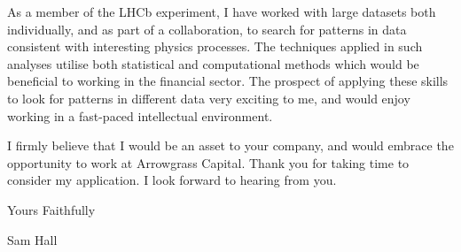 As a member of the LHCb experiment,
I have worked with large datasets both individually, and as part of a collaboration, to search for
patterns in data consistent with interesting physics processes.
The techniques applied in such analyses utilise both statistical and computational methods which
would be beneficial to working in the financial sector.
The prospect of applying these skills to look for patterns in different data very exciting to me,
and would enjoy working in a fast-paced intellectual environment.

I firmly believe that I would be an asset to your company, and would embrace the
opportunity to work at Arrowgrass Capital.
Thank you for taking time to consider my application.
I look forward to hearing from you.










Yours Faithfully


Sam Hall


